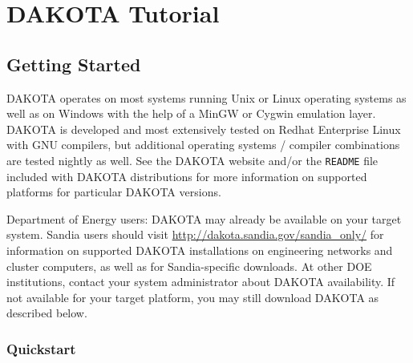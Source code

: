 \chapter{DAKOTA Tutorial}\label{tutorial}

\section{Getting Started}\label{tutorial:installation}

DAKOTA operates on most systems running Unix or Linux operating
systems as well as on Windows with the help of a MinGW or Cygwin
emulation layer.  DAKOTA is developed and most extensively tested on
Redhat Enterprise Linux with GNU compilers, but additional operating
systems / compiler combinations are tested nightly as well.  See the
DAKOTA website and/or the {\tt README} file included with DAKOTA
distributions for more information on supported platforms for
particular DAKOTA versions.

Department of Energy users: DAKOTA may already be available on your
target system. Sandia users should visit
\url{http://dakota.sandia.gov/sandia_only/} for information on
supported DAKOTA installations on engineering networks and cluster
computers, as well as for Sandia-specific downloads.  At other DOE
institutions, contact your system administrator about DAKOTA
availability.  If not available for your target platform, you may
still download DAKOTA as described below.

\subsection {Quickstart}\label{tutorial:installation:quickstart}

